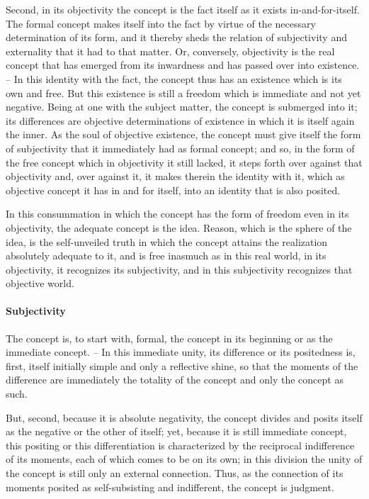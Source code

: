 \documentclass{article}
\begin{document}
Second, in its objectivity the concept is the fact itself as it exists in-and-for-itself.
The formal concept makes itself into the fact by virtue of the
necessary determination of its form, and it thereby sheds the relation
of subjectivity and externality that it had to that matter. Or, conversely,
objectivity is the real concept that has emerged from its inwardness and has
passed over into existence. – In this identity with the fact, the concept
thus has an existence which is its own and free. But this existence is still a
freedom which is immediate and not yet negative. Being at one with the
subject matter, the concept is submerged into it; its differences are objective
determinations of existence in which it is itself again the inner. As the soul
of objective existence, the concept must give itself the form of subjectivity
that it immediately had as formal concept; and so, in the form of the free
concept which in objectivity it still lacked, it steps forth over against that
objectivity and, over against it, it makes therein the identity with it, which
as objective concept it has in and for itself, into an identity that is also posited.

In this consummation in which the concept has the form of freedom
even in its objectivity, the adequate concept is the idea. Reason, which is
the sphere of the idea, is the self-unveiled truth in which the concept
attains the realization absolutely adequate to it, and is free inasmuch as in
this real world, in its objectivity, it recognizes its subjectivity, and in this
subjectivity recognizes that objective world.

\paragraph{Subjectivity}

The concept is, to start with, formal, the concept in its beginning or as
the immediate concept. – In this immediate unity, its difference or its
positedness is, first, itself initially simple and only a reflective shine, so that
the moments of the difference are immediately the totality of the concept
and only the concept as such.

But, second, because it is absolute negativity, the concept divides and
posits itself as the negative or the other of itself; yet, because it is still
immediate concept, this positing or this differentiation is characterized by
the reciprocal indifference of its moments, each of which comes to be on
its own; in this division the unity of the concept is still only an external
connection. Thus, as the connection of its moments posited as self-subsisting
and indifferent, the concept is judgment.
\end{document}
